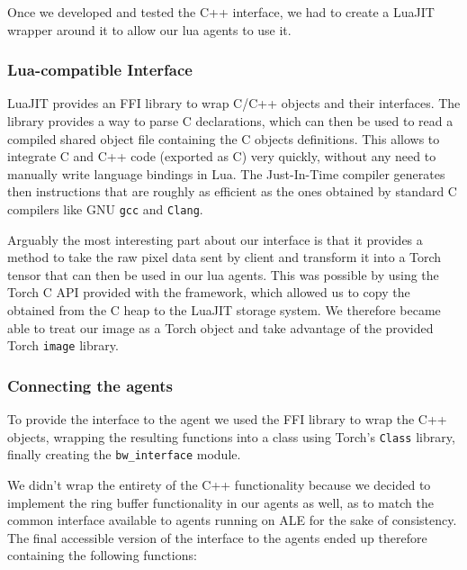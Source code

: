 Once we developed and tested the C++ interface, we had to create a LuaJIT
wrapper around it to allow our lua agents to use it.

\subsubsection{Lua-compatible Interface}

LuaJIT provides an FFI library to wrap C/C++ objects and their interfaces. The
library provides a way to parse C declarations, which can then be used to read a
compiled shared object file containing the C objects definitions. This allows to
integrate C and C++ code (exported as C) very quickly, without any need to
manually write language bindings in Lua. The Just-In-Time compiler generates
then instructions that are roughly as efficient as the ones obtained by standard
C compilers like GNU \texttt{gcc} and \texttt{Clang}.

Arguably the most interesting part about our interface is that it provides a
method to take the raw pixel data sent by client and transform it into a Torch
tensor that can then be used in our lua agents. This was possible by using the
Torch C API provided with the framework, which allowed us to copy the obtained
from the C heap to the LuaJIT storage system. We therefore became able to treat
our image as a Torch object and take advantage of the provided Torch
\texttt{image} library.

\subsubsection{Connecting the agents}

To provide the interface to the agent we used the FFI library to wrap the C++
objects, wrapping the resulting functions into a class using Torch's
\texttt{Class} library, finally creating the \texttt{bw\_interface} module.

We didn't wrap the entirety of the C++ functionality because we decided to
implement the ring buffer functionality in our agents as well, as to match the
common interface available to agents running on ALE for the sake of consistency.
The final accessible version of the interface to the agents ended up therefore
containing the following functions:

